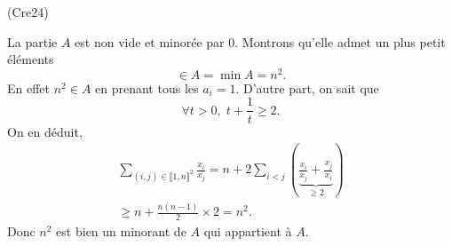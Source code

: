 \begin{tiny}(Cre24)\end{tiny} La partie $A$ est non vide et minorée par $0$. Montrons qu'elle admet un plus petit éléments
\[
  \in A = \min A = n^2.
\]
En effet $n^2 \in A$ en prenant tous les $a_i=1$. D'autre part, on sait que
\[
  \forall t >0, \; t + \frac{1}{t} \geq 2.
\]
On en déduit,
\begin{multline*}
  \sum_{(i,j)\in \llbracket 1,n\rrbracket^2} \frac{x_i}{x_j} 
  = n +  2\sum_{i < j} \left(\underset{ \geq 2}{\underbrace{\frac{x_i}{x_j} + \frac{x_j}{x_i}}}\right)\\
  \geq n + \frac{n(n-1)}{2}\times 2 = n^2.
\end{multline*}
Donc $n^2$ est bien un minorant de $A$ qui appartient à $A$.

